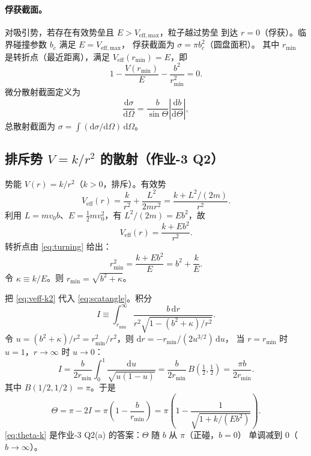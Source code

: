 \documentclass[UTF8,a4paper,11pt]{ctexart}
\begin{document}
\paragraph{俘获截面。}
对吸引势，若存在有效势垒且 $E>V_{\mathrm{eff,max}}$，粒子越过势垒
到达 $r=0$（俘获）。临界碰撞参数 $b_c$ 满足 $E=V_{\mathrm{eff,max}}$，
俘获截面为 $\sigma=\pi b_c^2$（圆盘面积）。
其中 $r_{\min}$ 是转折点（最近距离），满足
$V_{\mathrm{eff}}(r_{\min})=E$，即
\begin{equation}
  1-\frac{V(r_{\min})}{E}-\frac{b^2}{r_{\min}^2}=0.
  \label{eq:turning}
\end{equation}
微分散射截面定义为
\begin{equation}
  \frac{\mathrm d\sigma}{\mathrm d\Omega}
  = \frac{b}{\sin\Theta}\left|\frac{\mathrm db}{\mathrm d\Theta}\right|,
  \label{eq:diffcross}
\end{equation}
总散射截面为 $\sigma=\int (\mathrm d\sigma/\mathrm d\Omega)\,\mathrm d\Omega$。

\subsection{排斥势 $V=k/r^2$ 的散射（作业-3 Q2）}
\label{sub:scattering}

势能 $V(r)=k/r^2$（$k>0$，排斥）。有效势
\begin{equation}
  V_{\mathrm{eff}}(r)=\frac{k}{r^2}+\frac{L^2}{2mr^2}
  =\frac{k+L^2/(2m)}{r^2}.
  \label{eq:veff-k}
\end{equation}
利用 $L=mv_0 b$、$E=\frac12 mv_0^2$，有 $L^2/(2m)=Eb^2$，故
\begin{equation}
  V_{\mathrm{eff}}(r)=\frac{k+Eb^2}{r^2}.
  \label{eq:veff-k2}
\end{equation}
转折点由 \eqref{eq:turning} 给出：
\begin{equation}
  r_{\min}^2 = \frac{k+Eb^2}{E} = b^2+\frac{k}{E}.
  \label{eq:rmin-k}
\end{equation}
令 $\kappa\equiv k/E$。则 $r_{\min}=\sqrt{b^2+\kappa}$。

把 \eqref{eq:veff-k2} 代入 \eqref{eq:scatangle}。积分
\begin{equation}
  I\equiv\int_{r_{\min}}^{\infty}
  \frac{b\,\mathrm dr}{r^2\sqrt{1-(b^2+\kappa)/r^2}}.
\end{equation}
令 $u=(b^2+\kappa)/r^2=r_{\min}^2/r^2$，则 $\mathrm dr=-r_{\min}/(2u^{3/2})\,\mathrm du$，
当 $r=r_{\min}$ 时 $u=1$，$r\to\infty$ 时 $u\to0$：
\begin{equation}
  I = \frac{b}{2r_{\min}}\int_0^1 \frac{\mathrm du}{\sqrt{u(1-u)}}
    = \frac{b}{2r_{\min}}\,B\!\left(\tfrac12,\tfrac12\right)
    = \frac{\pi b}{2r_{\min}}.
\end{equation}
其中 $B(1/2,1/2)=\pi$。于是
\begin{equation}
  \Theta = \pi - 2I = \pi\left(1-\frac{b}{r_{\min}}\right)
  = \pi\left(1-\frac{1}{\sqrt{1+k/(Eb^2)}}\right).
  \label{eq:theta-k}
\end{equation}
\eqref{eq:theta-k} 是作业-3 Q2(a) 的答案：$\Theta$ 随 $b$ 从 $\pi$（正碰，$b=0$）
单调减到 $0$（$b\to\infty$）。
\end{document}
